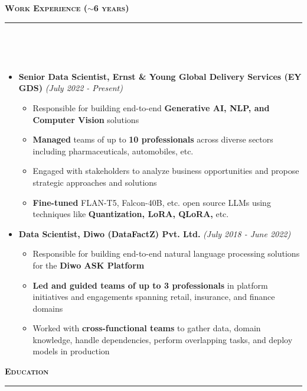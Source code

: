 \documentclass[a4paper,10pt]{article}
\newcommand{\isep}{-2 pt}
\newcommand{\lsep}{-0.5cm}
\newcommand{\resheading}[1]{{\small
        {
            \begin{minipage}
                {0.992\textwidth}\textbf{{\textsc{#1 \vphantom{p\^{E}} }}}
                \\[-0.3cm]
                \hrule
            \end{minipage}
            \\[-0.5cm]
        }
 }}
\begin{document}
\vspace{4pt}
\noindent
\resheading{\textbf{\large Work Experience ($\sim$6 years)}}\\[\lsep]
\vspace{4pt}
\begin{itemize}
    \item \textbf{Senior Data Scientist, Ernst \& Young Global Delivery Services (EY GDS)} \hfill {\emph{(July 2022 - Present)}}
    \\ [-0.6cm]
    \begin{itemize}\itemsep \isep
        \item Responsible for building end-to-end \textbf{Generative AI, NLP, and Computer Vision} solutions
        \item \textbf{Managed} teams of up to \textbf{10 professionals} across diverse sectors including pharmaceuticals, automobiles, etc.
        \item Engaged with stakeholders to analyze business opportunities and propose strategic approaches and solutions
        \item \textbf{Fine-tuned} FLAN-T5, Falcon-40B, etc. open source LLMs using techniques like \textbf{Quantization, LoRA, QLoRA,} etc.
    \\ [-0.5cm]
    \end{itemize}
    
    \item \textbf{Data Scientist, Diwo (DataFactZ) Pvt. Ltd.} \hfill {\emph{(July 2018 - June 2022)}}
    \\ [-0.6cm]
    \begin{itemize}\itemsep \isep
        \item Responsible for building end-to-end natural language processing solutions for the \textbf{Diwo ASK Platform}
        \item \textbf{Led and guided teams of up to 3 professionals} in platform initiatives and engagements spanning retail, insurance, and finance domains
        \item Worked with \textbf{cross-functional teams} to gather data, domain knowledge, handle dependencies, perform overlapping tasks, and deploy models in production  
    \\ [-0.5cm]
    \end{itemize}

\end{itemize}
\vspace{4pt}
\noindent
\resheading{\textbf{\large Education}}\\[\lsep]
\vspace{0pt}
\end{document}
